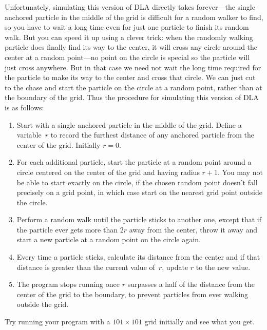 \documentclass[12pt]{article}
\begin{document}
\begin{exercises}
\begin{enumerate}
  Unfortunately, simulating this version of DLA directly takes
  forever---the single anchored particle in the middle of the grid is
  difficult for a random walker to find, so you have to wait a long time
  even for just one particle to finish its random walk.  But you can speed
  it up using a clever trick: when the randomly walking particle does
  finally find its way to the center, it will cross any circle around the
  center at a random point---no point on the circle is special so the
  particle will just cross anywhere.  But in that case we need not wait the
  long time required for the particle to make its way to the center and
  cross that circle.  We can just cut to the chase and start the particle
  on the circle at a random point, rather than at the boundary of the grid.
  Thus the procedure for simulating this version of DLA is as follows:
{\renewcommand{\labelenumii}{\roman{enumii})\ }
\begin{enumerate}\setlength{\itemsep}{0pt}
\item Start with a single anchored particle in the middle of the grid.
  Define a variable~$r$ to record the furthest distance of any anchored
  particle from the center of the grid.  Initially $r=0$.
\item For each additional particle, start the particle at a random point
  around a circle centered on the center of the grid and having radius
  $r+1$.  You may not be able to start exactly on the circle, if the chosen
  random point doesn't fall precisely on a grid point, in which case start
  on the nearest grid point outside the circle.
\item Perform a random walk until the particle sticks to another one,
  except that if the particle ever gets more than $2r$ away from the
  center, throw it away and start a new particle at a random point on the
  circle again.
\item Every time a particle sticks, calculate its distance from the center
  and if that distance is greater than the current value of~$r$, update $r$
  to the new value.
\item The program stops running once $r$ surpasses a half of the distance
  from the center of the grid to the boundary, to prevent particles from
  ever walking outside the grid.
\end{enumerate}}
Try running your program with a $101\times101$ grid initially and see what
you get.
\end{enumerate}

\end{exercises}
\end{document}
